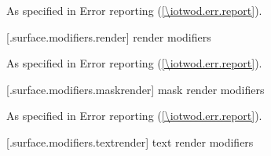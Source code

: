 \begin{itemdecl}
\end{itemdecl}
\begin{itemdescr}
\pnum
\effects


\pnum
\postconditions


\pnum
\throws
As specified in Error reporting (\ref{\iotwod.err.report}).


\pnum
\remarks


\pnum
\errors


\pnum
\realnotes


\end{itemdescr}

 [\iotwod.surface.modifiers.render] { render modifiers}

\begin{itemdecl}
\end{itemdecl}
\begin{itemdescr}
\pnum
\effects

\pnum
\postconditions

\pnum
\throws
As specified in Error reporting (\ref{\iotwod.err.report}).

\pnum
\remarks

\pnum
\errors

\pnum
\realnotes

\end{itemdescr}

 [\iotwod.surface.modifiers.maskrender] { mask render modifiers}

\begin{itemdecl}
\end{itemdecl}
\begin{itemdescr}
\pnum
\effects

\pnum
\postconditions

\pnum
\throws
As specified in Error reporting (\ref{\iotwod.err.report}).

\pnum
\remarks

\pnum
\errors

\pnum
\realnotes

\end{itemdescr}

 [\iotwod.surface.modifiers.textrender] { text render modifiers}

